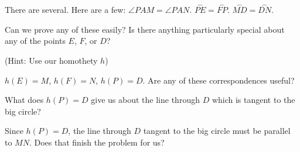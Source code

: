 


There are several.  Here are a few:  $\angle PAM = \angle PAN$.  $\overset{\frown}{PE} = \overset{\frown}{FP}$.  $\overset{\frown}{MD} = \overset{\frown}{DN}$.

Can we prove any of these easily?  Is there anything particularly special about any of the points $E$, $F$, or $D$?

(Hint: Use our homothety $h$)



$h(E) = M$, $h(F) = N$, $h(P) = D$. Are any of these correspondences useful?



What does $h(P)=D$ give us about the line through $D$ which is tangent to the big circle?








Since $h(P) = D$, the line through $D$ tangent to the big circle must be parallel to $MN$. Does that finish the problem for us?

